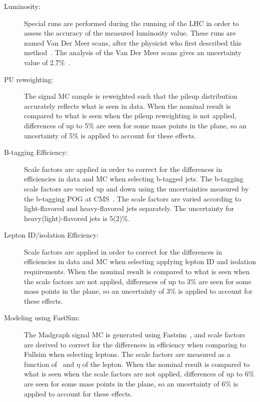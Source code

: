 \begin{description}

\item[Luminosity:] 
  Special runs are performed during the running of the LHC in order to assess the accuracy of the measured luminosity value.
  These runs are named Van Der Meer scans, after the physicist who first described this method~\cite{vdm}.
  The analysis of the Van Der Meer scans gives an uncertainty value of 2.7\%~\cite{lumi15up}.

\item[PU reweighting:] 
  The signal MC sample is reweighted such that the pileup distribution accurately reflects what is seen in data.
  When the nominal result is compared to what is seen when the pileup reweighting is not applied,
  differences of up to 5\% are seen for some mass points in the plane, so an uncertainty of 5\% is applied to account for these effects. 

\item[B-tagging Efficiency:] 
  Scale factors are applied in order to correct for the differences in efficiencies in data and MC when selecting b-tagged jets.
  The b-tagging scale factors are varied up and down using the uncertainties measured by the b-tagging POG at CMS~\cite{beff_2015}.  
  The scale factors are varied according to light-flavored and heavy-flavored jets separately. The uncertainty for heavy(light)-flavored jets is 5(2)\%.  

\item[Lepton ID/isolation Efficiency:] 
  Scale factors are applied in order to correct for the differences in efficiencies in data and MC when selecting applying lepton ID and isolation requirements.
  When the nominal result is compared to what is seen when the scale factors are not applied,
  differences of up to 3\% are seen for some mass points in the plane, so an uncertainty of 3\% is applied to account for these effects. 
  
\item[Modeling using FastSim:] 
  The Madgraph signal MC is generated using Fastsim~\cite{fastsim},
  and scale factors are derived to correct for the differences in efficiency when comparing to Fullsim when selecting leptons.
  The scale factors are measured as a function of \pt\ and $\eta$ of the lepton.
  When the nominal result is compared to what is seen when the scale factors are not applied,
  differences of up to 6\% are seen for some mass points in the plane, so an uncertainty of 6\% is applied to account for these effects. 


\end{description}
